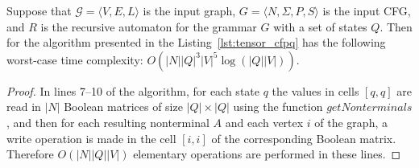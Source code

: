 \begin{theorem}\label{thm:time_tns}
	Suppose that $\mathcal{G} = \langle V, E, L \rangle$ is the input graph, $G =\langle N, \Sigma, P, S \rangle$ is the input CFG, and $R$ is the recursive automaton for the grammar $G$ with a set of states $Q$. Then for the algorithm presented in the Listing~\ref{lst:tensor_cfpq} has the following worst-case time complexity: $O(|N||Q|^3|V|^5 \log (|Q||V|))$.
\end{theorem}
\begin{proof}
In lines 7--10 of the algorithm, for each state $q$ the values in cells $[q, q]$ are read in $|N|$ Boolean matrices of size $|Q| \times |Q|$ using the function $\textit{getNonterminals}$, and then for each resulting nonterminal $A$ and each vertex $i$ of the graph, a write operation is made in the cell $[i, i]$ of the corresponding Boolean matrix. Therefore $O(|N||Q||V|)$ elementary operations are performed in these lines.


\end{proof}
